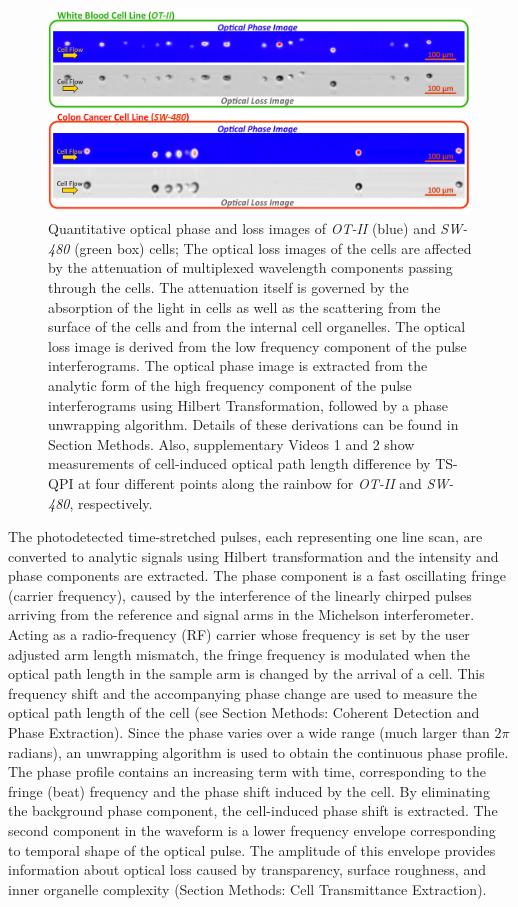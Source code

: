 \documentclass[aps,pra,reprint,superscriptaddress]{revtex4-1}
\begin{document}
\begin{figure}
\includegraphics[scale=0.2]{Figure2DImage.jpg}
\caption{\label{fig:2DImage} Quantitative optical phase and loss images of \textit{OT-II} (blue) and \textit{SW-480} (green box) cells; The optical loss images of the cells are affected by the attenuation of multiplexed wavelength components passing through the cells. The attenuation itself is governed by the absorption of the light in cells as well as the scattering from the surface of the cells and from the internal cell organelles. The optical loss image is derived from the low frequency component of the pulse interferograms. The optical phase image is extracted from the analytic form of the high frequency component of the pulse interferograms using Hilbert Transformation, followed by a phase unwrapping algorithm. Details of these derivations can be found in Section Methods. Also, supplementary Videos 1 and 2 show measurements of cell-induced optical path length difference by TS-QPI at four different points along the rainbow for \textit{OT-II} and \textit{SW-480}, respectively.}
\end{figure}

The photodetected time-stretched pulses, each representing one line scan, are converted to analytic signals using Hilbert transformation \cite{king2009hilbert} and the intensity and phase components are extracted. The phase component is a fast oscillating fringe (carrier frequency), caused by the interference of the linearly chirped pulses arriving from the reference and signal arms in the Michelson interferometer. Acting as a radio-frequency (RF) carrier whose frequency is set by the user adjusted arm length mismatch, the fringe frequency is modulated when the optical path length in the sample arm is changed by the arrival of a cell. This frequency shift and the accompanying phase change are used to measure the optical path length of the cell (see Section Methods: Coherent Detection and Phase Extraction). Since the phase varies over a wide range (much larger than $2 \pi$ radians), an unwrapping algorithm is used to obtain the continuous phase profile. The phase profile contains an increasing term with time, corresponding to the fringe (beat) frequency and the phase shift induced by the cell. By eliminating the background phase component, the cell-induced phase shift is extracted. The second component in the waveform is a lower frequency envelope corresponding to temporal shape of the optical pulse. The amplitude of this envelope provides information about optical loss caused by transparency, surface roughness, and inner organelle complexity (Section Methods: Cell Transmittance Extraction). 
\end{document}
